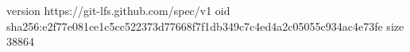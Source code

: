 version https://git-lfs.github.com/spec/v1
oid sha256:e2f77e081ce1c5cc522373d77668f7f1db349c7c4ed4a2c05055c934ac4e73fe
size 38864
